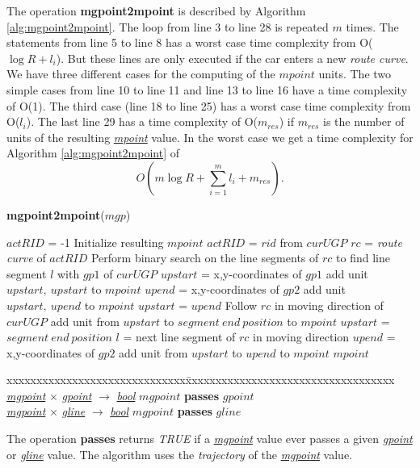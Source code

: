 \documentclass[a4paper]{article}
\newcommand{\op}[1]{\textbf{#1}}
\newcommand{\dt}[1]{\textsl{\underline{#1}}}
\newcommand{\true}{\textsl{TRUE}}
\begin{document}
The operation \op{mgpoint2mpoint} is described by Algorithm
\ref{alg:mgpoint2mpoint}. The loop from line 3 to line 28 is repeated $m$ times.
The statements from
line 5 to line 8 has a worst case time complexity from O($\log R + l_i$). But
these lines are only executed if the car enters a new \textit{route curve}.
We have three different cases for the computing of the $mpoint$ units. The
two simple cases from line 10 to line 11 and line 13 to line 16 have a time
complexity of O(1).
The third case (line 18 to line 25) has a worst case time complexity from
O($l_i$). The last line 29 has a time complexity of O($m_{res}$) if $m_{res}$ is
the number of units of the resulting \dt{mpoint} value. In the worst case we get
a time complexity for Algorithm \ref{alg:mgpoint2mpoint} of
\[O(m \log {R} + \sum_{i=1}^{m}{l_i} + m_{res}).\]
\begin{algorithm}[H]
  \caption{\op{mgpoint2mpoint}($mgp$)}
  \label{alg:mgpoint2mpoint}
  \begin{algorithmic}[1]
    \STATE $actRID$ = -1
    \STATE Initialize resulting $mpoint$
        \STATE $actRID$ = $rid$ from $curUGP$
        \STATE $rc$ = \textit{route curve} of $actRID$
        \STATE Perform binary search on the line segments of $rc$ to find
        line segment $l$ with $gp1$ of $curUGP$
        \STATE $upstart$ = x,y-coordinates of $gp1$
      \ENDIF
        \STATE add unit $upstart,\ upstart$ to $mpoint$
      \ELSE
          \STATE $upend$ = x,y-coordinates of $gp2$
          \STATE add unit $upstart,\ upend$ to $mpoint$
          \STATE $upstart$ = $upend$
        \ELSE
          \STATE Follow $rc$ in moving direction of $curUGP$
            \STATE add unit from $upstart$ to $segment\ end\ position$ to
$mpoint$
            \STATE $upstart$ = $segment\ end\ position$
            \STATE $l$ = next line segment of $rc$ in moving direction
          \ENDWHILE
          \STATE $upend$ = x,y-coordinates of $gp2$
          \STATE add unit from $upstart$ to $upend$ to $mpoint$
        \ENDIF
      \ENDIF
    \ENDFOR
    \RETURN $mpoint$
  \end{algorithmic}
\end{algorithm}


\begin{tabbing}
xxxxxxxxxxxxxxxxxxxxxxxxxxxxxx\=xxxxxxxxxxxxxxxxxxxxxxxxxxxxxxxxxxx\kill
\dt{mgpoint} $\times$ \dt{gpoint} $\rightarrow$ \dt{bool} \> $mgpoint$
\op{passes} $gpoint$\\
\dt{mgpoint} $\times$ \dt{gline} $\rightarrow$ \dt{bool} \> $mgpoint$
\op{passes} $gline$\\
\end{tabbing}
The operation \op{passes} returns \true{} if a \dt{mgpoint} value ever passes a
given \dt{gpoint} or \dt{gline} value. The algorithm uses the \textit{trajectory} of
the \dt{mgpoint} value.
\end{document}
